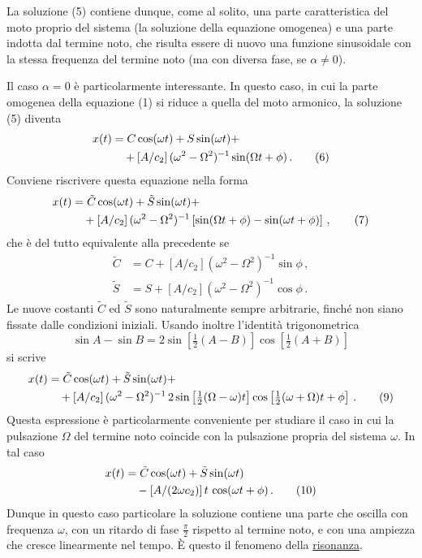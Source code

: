 \documentclass[11pt, a4paper]{book}
\numberwithin{equation}{section}
\begin{document}
La soluzione (5) contiene dunque, come al solito, una parte caratteristica del
moto proprio del sistema (la soluzione della equazione omogenea) e una parte
indotta dal termine noto, che risulta essere di nuovo una funzione sinusoidale
con la stessa frequenza del termine noto (ma con diversa fase, se $\alpha \neq 0$).

Il caso $\alpha = 0$ è particolarmente interessante. In questo caso, in cui la
parte omogenea della equazione (1) si riduce a quella del moto armonico, la
soluzione (5) diventa
\begin{align}
    x(t) &= C \cos(\omega t) + S \sin(\omega t) + \notag \\
    &\quad + \left[ A / c_2 \right] (\omega^2 - \Omega^2)^{-1} \sin(\Omega t + \phi) \,. \tag{6}
\end{align}
Conviene riscrivere questa equazione nella forma
\begin{align}
    x(t) &= \tilde{C} \cos(\omega t) + \tilde{S} \sin(\omega t) + \notag \\
    &\quad + \left[ A / c_2 \right] (\omega^2 - \Omega^2)^{-1} \left[ \sin(\Omega t+\phi) - \sin(\omega t+\phi) \right] \,, \tag{7}
\end{align}
che è del tutto equivalente alla precedente se
\begin{align}
    \tilde{C} &= C + \left[ A / c_2 \right] (\omega^2-\Omega^2)^{-1} \sin\phi \,, \tag{8a} \\
    \tilde{S} &= S + \left[ A / c_2 \right] (\omega^2-\Omega^2)^{-1} \cos\phi \,. \tag{8b}
\end{align}
Le nuove costanti $\tilde{C}$ ed $\tilde{S}$ sono naturalmente sempre arbitrarie, finché
non siano fissate dalle condizioni iniziali. Usando inoltre l'identità
trigonometrica
\[
    \sin A - \sin B = 2 \sin\left[\tfrac{1}{2}(A-B)\right] \cos\left[\tfrac{1}{2}(A+B)\right]
\]
si scrive
\begin{align}
    x(t) &= \tilde{C} \cos(\omega t) + \tilde{S} \sin(\omega t) + \notag \\
    &\quad + \left[ A / c_2 \right] (\omega^2-\Omega^2)^{-1} \, 2 \sin\left[\tfrac{1}{2}(\Omega-\omega)t\right] \cos\left[\tfrac{1}{2}(\omega+\Omega)t+\phi\right] \,. \tag{9}
\end{align}
Questa espressione è particolarmente conveniente per studiare il caso in cui la
pulsazione $\Omega$ del termine noto coincide con la pulsazione propria del sistema
$\omega$. In tal caso
\begin{align}
    x(t) &= \tilde{C} \cos(\omega t) + \tilde{S} \sin(\omega t) \notag \\
    &\quad - \left[ A/(2\omega c_2) \right] t \, \cos(\omega t + \phi) \,. \tag{10}
\end{align}
Dunque in questo caso particolare la soluzione contiene una parte che oscilla
con frequenza $\omega$, con un ritardo di fase $\frac{\pi}{2}$ rispetto al termine noto, e
con una ampiezza che cresce linearmente nel tempo. È questo il fenomeno della
\underline{risonanza}.
\end{document}
